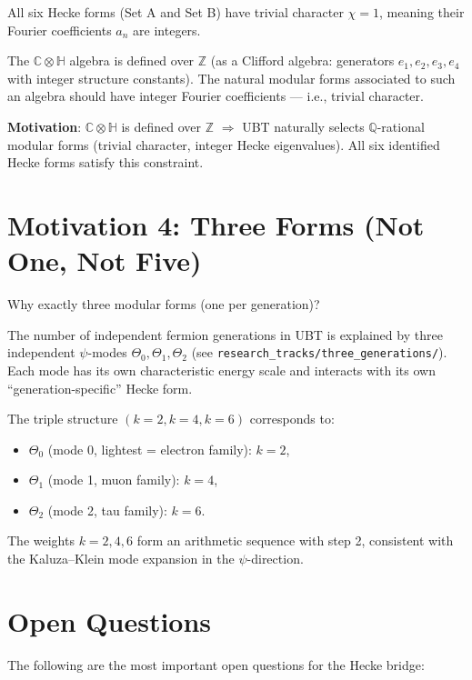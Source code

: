 \documentclass[12pt]{article}
\theoremstyle{definition}
\theoremstyle{remark}
\begin{document}
All six Hecke forms (Set A and Set B) have trivial character $\chi = 1$, meaning
their Fourier coefficients $a_n$ are integers.

The $\mathbb{C}\otimes\mathbb{H}$ algebra is defined over $\mathbb{Z}$
(as a Clifford algebra: generators $e_1, e_2, e_3, e_4$ with integer structure
constants).  The natural modular forms associated to such an algebra should have
integer Fourier coefficients --- i.e., trivial character.

\begin{motivatebox}
\textbf{Motivation}: $\mathbb{C}\otimes\mathbb{H}$ is defined over $\mathbb{Z}$
$\Rightarrow$ UBT naturally selects $\mathbb{Q}$-rational modular forms
(trivial character, integer Hecke eigenvalues).
All six identified Hecke forms satisfy this constraint.
\end{motivatebox}

\section{Motivation 4: Three Forms (Not One, Not Five)}
\label{sec:three}

Why exactly three modular forms (one per generation)?

The number of independent fermion generations in UBT is explained by three independent
$\psi$-modes $\Theta_0, \Theta_1, \Theta_2$ (see \texttt{research\_tracks/three\_generations/}).
Each mode has its own characteristic energy scale and interacts with its own
``generation-specific'' Hecke form.

The triple structure $(k=2, k=4, k=6)$ corresponds to:
\begin{itemize}
  \item $\Theta_0$ (mode 0, lightest = electron family): $k = 2$,
  \item $\Theta_1$ (mode 1, muon family): $k = 4$,
  \item $\Theta_2$ (mode 2, tau family): $k = 6$.
\end{itemize}
The weights $k = 2, 4, 6$ form an arithmetic sequence with step 2, consistent
with the Kaluza--Klein mode expansion in the $\psi$-direction.

\section{Open Questions}
\label{sec:open}

The following are the most important open questions for the Hecke bridge:
\end{document}
